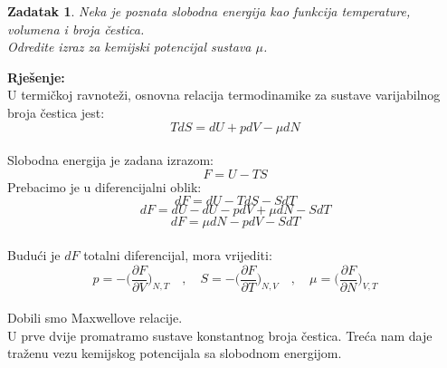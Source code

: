 \documentclass[a4paper,12pt]{article}
\newtheorem{ZDK}{Zadatak}[section]
\begin{document}
\newpage
\begin{ZDK}
	Neka je poznata slobodna energija kao funkcija temperature, volumena i broja \v{c}estica. \\
	Odredite izraz za kemijski potencijal sustava $\mu$.
\end{ZDK}
\textbf{Rje\v{s}enje:} \\
\newline
U termi\v{c}koj ravnote\v{z}i, osnovna relacija termodinamike za sustave varijabilnog broja \v{c}estica jest:
$$ TdS=dU+pdV-\mu dN $$
\\
Slobodna energija je zadana izrazom:
$$ F=U-TS $$
Prebacimo je u diferencijalni oblik:
$$ dF=dU-TdS-SdT $$
$$ dF=dU-dU-pdV+\mu dN-SdT $$
$$ dF=\mu dN-pdV-SdT $$
\\
Budu\'ci je $dF$ totalni diferencijal, mora vrijediti:
$$ p=-\Big( \frac{\partial F}{\partial V} \Big)_{N,T} \quad , \quad S=-\Big( \frac{\partial F}{\partial T} \Big)_{N,V} \quad , \quad
\mu =\Big( \frac{\partial F}{\partial N} \Big)_{V,T} $$
\\
Dobili smo Maxwellove relacije. \\
U prve dvije promatramo sustave konstantnog broja \v{c}estica. Tre\'ca nam daje tra\v{z}enu vezu kemijskog potencijala sa slobodnom energijom.

\newpage
\end{document}
